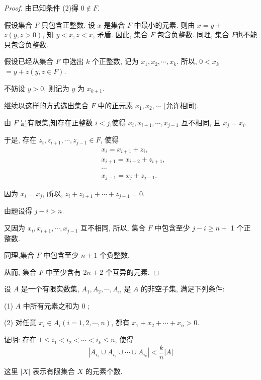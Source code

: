 \begin{proof}
	由已知条件 (2)得 $0 \notin F$.

	假设集合 $F$ 只包含正整数. 设 $x$ 是集合 $F$ 中最小的元素. 则由 $x=y+$ $z(y, z>0)$, 知 $y<x, z<x$, 矛盾. 因此, 集合 $F$ 包含负整数. 同理, 集合 $F$也不能只包含负整数.

	假设已经从集合 $F$ 中选出 $k$ 个正整数, 记为 $x_{1}, x_{2}, \cdots, x_{k}$. 所以, $0<x_{k}$\\
	$=y+z(y, z \in F)$.

	不妨设 $y>0$, 则记为 $y$ 为 $x_{k+1}$.

	继续以这样的方式选出集合 $F$ 中的正元素 $x_{1}, x_{2}, \cdots$ (允许相同).

	由 $F$ 是有限集,知存在正整数 $i<j$,使得 $x_{i}, x_{i+1}, \cdots, x_{j-1}$ 互不相同, 且 $x_{j}=x_{i}$.

	于是, 存在 $z_{i}, z_{i+1}, \cdots, z_{j-1} \in F$, 使得
	$$
		\begin{aligned}
			 & x_{i}=x_{i+1}+z_{i},     \\
			 & x_{i+1}=x_{i+2}+z_{i+1}, \\
			 & \cdots                   \\
			 & x_{j-1}=x_{j}+z_{j-1} .
		\end{aligned}
	$$

	因为 $x_{i}=x_{j}$, 所以, $z_{i}+z_{i+1}+\cdots+z_{j-1}=0$.

	由题设得 $j-i>n$.

	又因为 $x_{i}, x_{i+1}, \cdots, x_{j-1}$ 互不相同, 所以, 集合 $F$ 中包含至少 $j-i \geqslant n+$ 1 个正整数.

	同理,集合 $F$ 中包含至少 $n+1$ 个负整数.

	从而, 集合 $F$ 中至少含有 $2 n+2$ 个互异的元素.
\end{proof}

\begin{example}
	设 $A$ 是一个有限实数集, $A_{1}, A_{2}, \cdots, A_{n}$ 是 $A$ 的非空子集, 满足下列条件:

	(1) $A$ 中所有元素之和为 0 ;

	(2) 对任意 $x_{i} \in A_{i}(i=1,2, \cdots, n)$, 都有 $x_{1}+x_{2}+\cdots+x_{n}>0$.

	证明: 存在 $1 \leqslant i_{1}<i_{2}<\cdots<i_{k} \leqslant n$, 使得
	$$
		\left|A_{i_{1}} \cup A_{i_{2}} \cup \cdots \cup A_{i_{k}}\right|<\frac{k}{n}|A|
	$$

	这里 $|X|$ 表示有限集合 $X$ 的元素个数.
\end{example}


